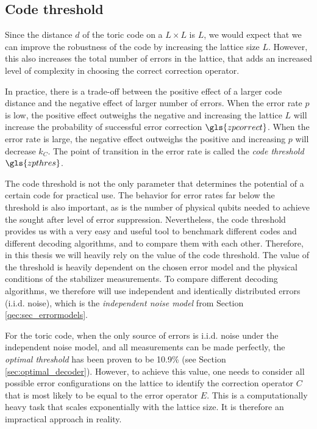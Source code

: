 \subsection{Code threshold}\label{sec:threshold}
Since the distance $d$ of the toric code on a $L\times L$ is $L$, we would expect that we can improve the robustness of the code by increasing the lattice size $L$. However, this also increases the total number of errors in the lattice, that adds an increased level of complexity in choosing the correct correction operator.

In practice, there is a trade-off between the positive effect of a larger code distance and the negative effect of larger number of errors. When the error rate $p$ is low, the positive effect outweighs the negative and increasing the lattice $L$ will increase the probability of successful error correction $\gls{zpcorrect}$. When the error rate is large, the negative effect outweighs the positive and increasing $p$ will decrease $k_C$. The point of transition in the error rate is called the \emph{code threshold} $\gls{zpthres}$.

The code threshold is not the only parameter that determines the potential of a certain code for practical use. The behavior for error rates far below the threshold is also important, as is the number of physical qubits needed to achieve the sought after level of error suppression. Nevertheless, the code threshold provides us with a very easy and useful tool to benchmark different codes and different decoding algorithms, and to compare them with each other. Therefore, in this thesis we will heavily rely on the value of the code threshold. The value of the threshold is heavily dependent on the chosen error model and the physical conditions of the stabilizer measurements. To compare different decoding algorithms, we therefore will use independent and identically distributed errors (i.i.d. noise), which is the \emph{independent noise model} from Section \ref{qec:sec_errormodels}.

For the toric code, when the only source of errors is i.i.d. noise under the independent noise model, and all measurements can be made perfectly, the \emph{optimal threshold} has been proven to be 10.9\% (see Section \ref{sec:optimal_decoder}). However, to achieve this value, one needs to consider all possible error configurations on the lattice to identify the correction operator $C$ that is most likely to be equal to the error operator $E$. This is a computationally heavy task that scales exponentially with the lattice size. It is therefore an impractical approach in reality.

